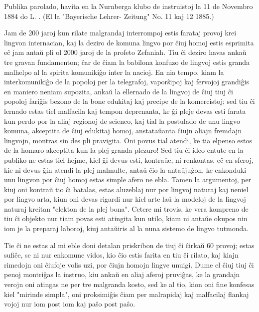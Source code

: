 \begin{center}
\footnotesize Publika parolado, havita en la Nurnberga klubo de instruistoj la
11 de Novembro 1884 do L. . (El la "Bayerische Lehrer-
                     Zeitung" No. 11 kaj 12 1885.)
\end{center}

   Jam de 200 jaroj kun rilate malgrandaj interrompoj estis farataj
provoj krei lingvon internacian, kaj la deziro de komuna lingvo por
\^ciuj homoj estis esprimita e\^c jam anta\u u pli ol 2000 jaroj de
la profeto Zefaniah. Tiu \^ci deziro havas anka\u u tre gravan
fundamenton; \^car de \^ciam la babilona konfuzo de lingvoj estis
granda malhelpo al la spirita komuniki\^go inter la nacioj. En nia
tempo, kiam la interkomuniki\^go de la popoloj per la telegrafoj,
vapor\^sipoj kaj fervojoj grandi\^gis en maniero neniam supozita,
anka\u u la ellernado de la lingvoj de \^ciuj tiuj \^ci popoloj
fari\^gis bezono de la bone edukitaj kaj precipe de la komercistoj;
sed tiu \^ci lernado estas tiel malfacila kaj tempon deprenanta, ke
\^gi pleje devas esti farata kun perdo por la aliaj regionoj de
scienco, kaj tial la postulado de unu lingvo komuna, akceptita de
\^ciuj edukitaj homoj, anstata\u uanta \^ciujn aliajn fremdajn
lingvojn, montras sin des pli pravigita. Oni povus tial atendi, ke
tia elpenso estos de la homaro akceptita kun la plej granda plezuro!
Sed tiu \^ci ideo entute en la publiko ne estas tiel hejme, kiel
\^gi devus esti, kontra\u ue, ni renkontas, e\^c en sferoj, kie ni
devus \^gin atendi la plej malmulte, anta\u u \^cio la anta\u
uju\^gon, ke enkonduki unu lingvon por \^ciuj homoj estas simple
afero ne ebla. Tamen la argumentoj, per kiuj oni kontra\u u tio \^ci
batalas, estas aluzeblaj nur por lingvoj naturaj kaj neniel por
lingvo arta, kiun oni devas rigardi nur kiel arte la\u u la modeloj
de la lingvoj naturaj kreitan "elekton de la plej bona". Cetere mi
trovis, ke vera kompreno de tiu \^ci objekto nur tiam povas esti
atingita kun utilo, kiam ni anta\u ue okupos nin iom je la preparaj
laboroj, kiuj anta\u uiris al la nuna sistemo de lingvo tutmonda.

   Tie \^ci ne estas al mi eble doni detalan priskribon de tiuj \^ci
\^cirka\u u 60 provoj; estas sufi\^ce, se ni nur enkomune vidos, kio
\^cio estis farita en tiu \^ci rilato, kaj kiajn rimedojn oni
\^ciufoje volis uzi, por \^ciujn homojn lingve unuigi. Dume el
\^ciuj tiuj \^ci penoj montri\^gas la instruo, kiu anka\u u en aliaj
aferoj pruvi\^gas, ke la grandajn verojn oni atingas ne per tre
malgranda kosto, sed ke al tio, kion oni fine konfesas kiel
"mirinde simpla", oni proksimi\^gis \^ciam per malrapidaj kaj
malfacilaj flankaj vojoj nur iom post iom kaj pa\^so post pa\^so.

